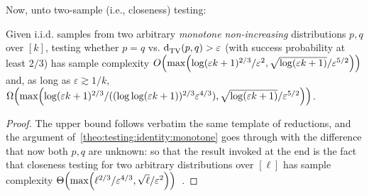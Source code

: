 \documentclass[11pt]{article}
\newcommand{\dst}{\varepsilon}
\newcommand{\ab}{k}
\newcommand{\p}{p}
\newcommand{\q}{q}
\begin{document}
Now, unto two-sample (i.e., closeness) testing:
\begin{theorem}\label{theo:testing:identity:monotone}
  Given i.i.d. samples from two arbitrary \emph{monotone non-increasing} distributions $\p,\q$ over $[\ab]$, testing whether $\p=\q$ vs. $\totalvardist{\p}{\q} > \dst$ (with success probability at least $2/3$) has sample complexity $\bigO{\max\mleft( \log(\dst\ab + 1)^{2/3}/\dst^{2}, \sqrt{\log(\dst\ab + 1)}/\dst^{5/2} \mright)}$ and, as long as $\dst \gtrsim 1/\ab$, $\bigOmega{\max\mleft( \log(\dst\ab + 1)^{2/3}/((\log\log(\dst\ab + 1))^{2/3}\dst^{4/3}), \sqrt{\log(\dst\ab + 1)}/\dst^{5/2} \mright)}$.
\end{theorem}
\begin{proof}
The upper bound follows verbatim the same template of reductions, and the argument of~\autoref{theo:testing:identity:monotone} goes through with the difference that now both $\p,\q$ are unknown: so that the result invoked at the end is the fact that closeness testing for two arbitrary distributions over $[\ell]$ has sample complexity $\bigTheta{\max\mleft( \ell^{2/3}/\dst^{4/3}, \sqrt{\ell}/\dst^{2} \mright)}$~\cite{CDVV:14}.


\end{proof}
\end{document}
